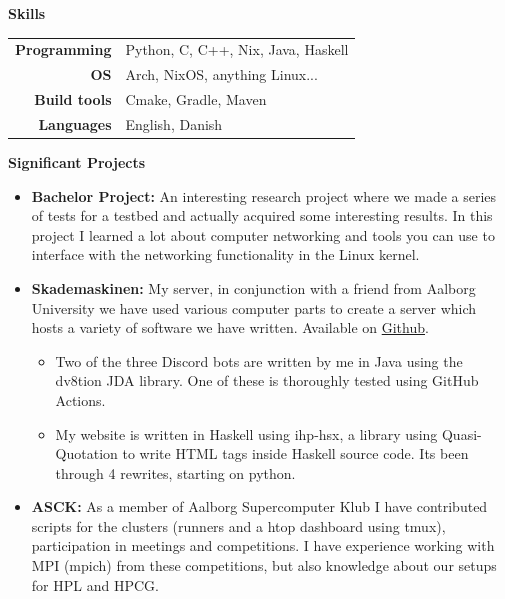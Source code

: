 \documentclass[a4paper, 14pt]{article}
\newcommand{\myitem}[1]{\item[\color{myorange}$\circ$]#1}
\newcommand{\newcvsection}[2]{
    \noindent\huge \textbf{#1} \color{myorange}\hrulefill\color{black}
    
    \normalsize
    #2    
    \vspace{.5cm}
}
\begin{document}
    \newcvsection{Skills}{
        \begin{table}[H]
            \begin{tabular}{rl}
                \textbf{Programming} & Python, C, C++, Nix, Java, Haskell\\
                \textbf{OS} & Arch, NixOS, anything Linux... \\
                \textbf{Build tools} & Cmake, Gradle, Maven \\
                \textbf{Languages} & English, Danish
            \end{tabular}
        \end{table}
    }

    \newcvsection{Significant Projects}{
        \begin{itemize}
            \myitem{
                \textbf{Bachelor Project: } An interesting research project where we made a series of tests for a testbed and actually acquired some interesting results. 
                In this project I learned a lot about computer networking and tools you can use to interface with the networking functionality in the Linux kernel.
            }
            \myitem{
                \textbf{Skademaskinen: } My server, in conjunction with a friend from Aalborg University we have used various computer parts to create a server which hosts a variety of software we have written.
                Available on \href{https://github.com/Skademaskinen}{Github}.
                \begin{itemize}
                    \myitem{
                        Two of the three Discord bots are written by me in Java using the dv8tion JDA library. One of these is thoroughly tested using GitHub Actions.
                    }
                    \myitem{
                        My website is written in Haskell using ihp-hsx, a library using Quasi-Quotation to write HTML tags inside Haskell source code. Its been through 4 rewrites, starting on python.
                    }
                \end{itemize}
            }

            \myitem{
                \textbf{ASCK: } As a member of Aalborg Supercomputer Klub I have contributed scripts for the clusters (runners and a htop dashboard using tmux), participation in meetings and competitions. 
                I have experience working with MPI (mpich) from these competitions, but also knowledge about our setups for HPL and HPCG.
            }
        \end{itemize}
    }
    
\end{document}
